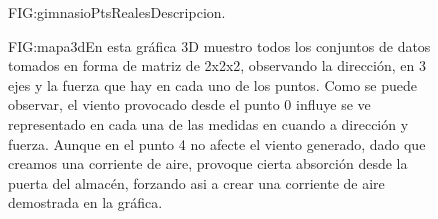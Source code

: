 \begin{figure}[Representación toma de puntos en gimnasio]{FIG:gimnasioPtsReales}{Descripcion.}
\end{figure}

\begin{figure}[Mapa de viento 3D]{FIG:mapa3d}{En esta gráfica 3D muestro todos los conjuntos de datos tomados en forma de matriz de 2x2x2, observando la dirección, en 3 ejes y la fuerza que hay en cada uno de los puntos. Como se puede observar, el viento provocado desde el punto 0 influye se ve representado en cada una de las medidas en cuando a dirección y fuerza. Aunque en el punto 4 no afecte el viento generado, dado que creamos una corriente de aire, provoque cierta absorción desde la puerta del almacén, forzando asi a crear una corriente de aire demostrada en la gráfica.}
\end{figure}